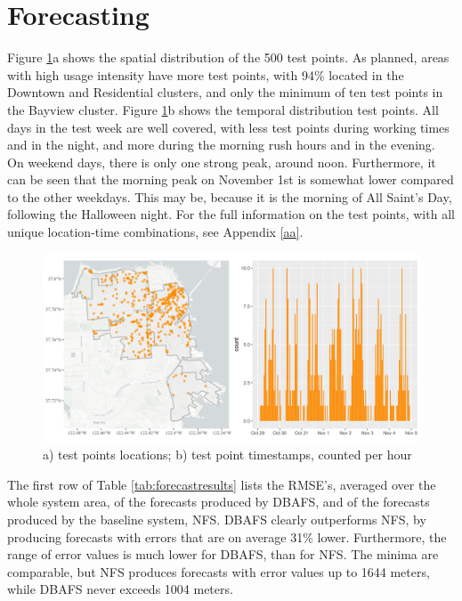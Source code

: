 \documentclass[12pt,oneside]{reedthesis}
\begin{document}
\section{Forecasting}\label{forecasting-1}

Figure \ref{fig:testpoints}a shows the spatial distribution of the 500
test points. As planned, areas with high usage intensity have more test
points, with 94\% located in the Downtown and Residential clusters, and
only the minimum of ten test points in the Bayview cluster. Figure
\ref{fig:testpoints}b shows the temporal distribution test points. All
days in the test week are well covered, with less test points during
working times and in the night, and more during the morning rush hours
and in the evening. On weekend days, there is only one strong peak,
around noon. Furthermore, it can be seen that the morning peak on
November 1st is somewhat lower compared to the other weekdays. This may
be, because it is the morning of All Saint's Day, following the
Halloween night. For the full information on the test points, with all
unique location-time combinations, see Appendix \ref{aa}.
\begin{figure}[H]
\includegraphics[width=\textwidth]{Figures/testpoints} \caption{a) test points locations; b) test point timestamps, counted per hour}\label{fig:testpoints}
\end{figure}
The first row of Table \ref{tab:forecastresults} lists the RMSE's,
averaged over the whole system area, of the forecasts produced by DBAFS,
and of the forecasts produced by the baseline system, NFS. DBAFS clearly
outperforms NFS, by producing forecasts with errors that are on average
31\% lower. Furthermore, the range of error values is much lower for
DBAFS, than for NFS. The minima are comparable, but NFS produces
forecasts with error values up to 1644 meters, while DBAFS never exceeds
1004 meters.
\end{document}

